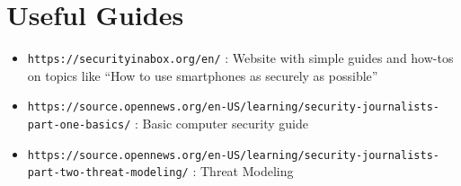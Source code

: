 \documentclass[11pt]{memoir}
\begin{document}
\section*{Useful Guides}
\begin{itemize}
   \item \texttt{https://securityinabox.org/en/} : Website with simple guides and how-tos on topics like ``How to use smartphones as securely as possible''
   \item \texttt{https://source.opennews.org/en-US/learning/security-journalists-part-one-basics/} : Basic computer security guide
   \item \texttt{https://source.opennews.org/en-US/learning/security-journalists-part-two-threat-modeling/} : Threat Modeling
\end{itemize}
\end{document}
